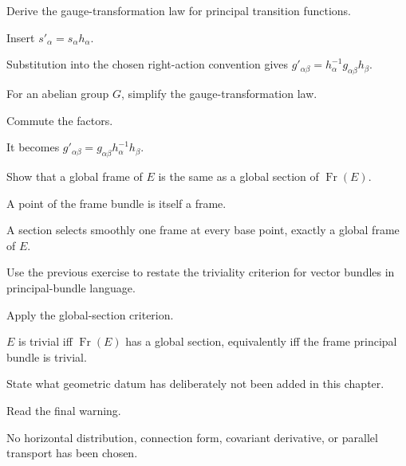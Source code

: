 \begin{exercise}\label{exr:vii08-20}
Derive the gauge-transformation law for principal transition functions.
\end{exercise}
\begin{hint}
Insert \(s'_\alpha=s_\alpha h_\alpha\).
\end{hint}
\begin{solution}
Substitution into the chosen right-action convention gives \(g'_{\alpha\beta}=h_{\alpha}^{-1}g_{\alpha\beta}h_{\beta}\).
\end{solution}

\begin{exercise}\label{exr:vii08-21}
For an abelian group \(G\), simplify the gauge-transformation law.
\end{exercise}
\begin{hint}
Commute the factors.
\end{hint}
\begin{solution}
It becomes \(g'_{\alpha\beta}=g_{\alpha\beta}h_\alpha^{-1}h_\beta\).
\end{solution}

\begin{exercise}\label{exr:vii08-22}
Show that a global frame of \(E\) is the same as a global section of \(\operatorname{Fr}(E)\).
\end{exercise}
\begin{hint}
A point of the frame bundle is itself a frame.
\end{hint}
\begin{solution}
A section selects smoothly one frame at every base point, exactly a global frame of \(E\).
\end{solution}

\begin{exercise}\label{exr:vii08-23}
Use the previous exercise to restate the triviality criterion for vector bundles in principal-bundle language.
\end{exercise}
\begin{hint}
Apply the global-section criterion.
\end{hint}
\begin{solution}
\(E\) is trivial iff \(\operatorname{Fr}(E)\) has a global section, equivalently iff the frame principal bundle is trivial.
\end{solution}

\begin{exercise}\label{exr:vii08-24}
State what geometric datum has deliberately not been added in this chapter.
\end{exercise}
\begin{hint}
Read the final warning.
\end{hint}
\begin{solution}
No horizontal distribution, connection form, covariant derivative, or parallel transport has been chosen.
\end{solution}


